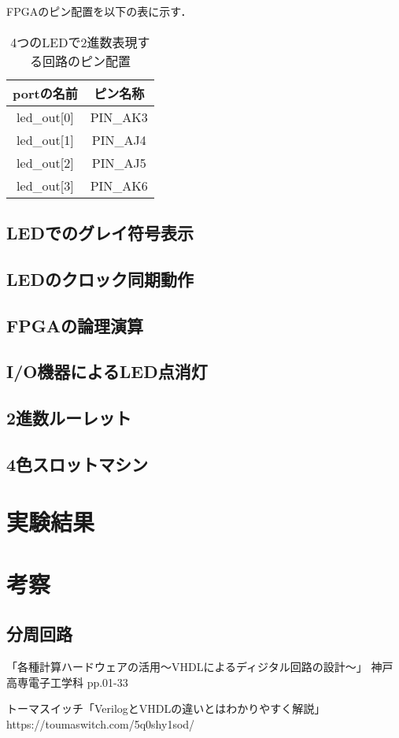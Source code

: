 \documentclass{ltjsarticle}
\begin{document}
		FPGAのピン配置を以下の表に示す．

		\begin{table}[H]
		\begin{center}
		\caption{4つのLEDで2進数表現する回路のピン配置}
		\label{tab:LED4}
		\begin{tabular}{cc} \toprule
			portの名前 & ピン名称 \\ \hline
			led\_out[0] & PIN\_AK3 \\
			led\_out[1] & PIN\_AJ4 \\
			led\_out[2] & PIN\_AJ5 \\
			led\_out[3] & PIN\_AK6 \\
			\bottomrule
		\end{tabular}
		\end{center}
		\end{table}

	\subsection{LEDでのグレイ符号表示}
	\subsection{LEDのクロック同期動作}
	\subsection{FPGAの論理演算}
	\subsection{I/O機器によるLED点消灯}
	\subsection{2進数ルーレット}
	\subsection{4色スロットマシン}
\section{実験結果}
\section{考察}
	\subsection{分周回路}
\begin{thebibliography}{99}
「各種計算ハードウェアの活用～VHDLによるディジタル回路の設計～」
神戸高専電子工学科 pp.01-33

トーマスイッチ「VerilogとVHDLの違いとはわかりやすく解説」
https://toumaswitch.com/5q0shy1sod/
\end{thebibliography}
\end{document}
